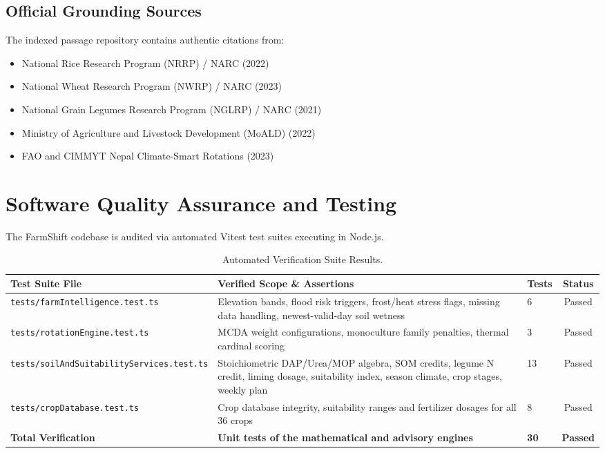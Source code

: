 \documentclass[11pt,a4paper]{report}
\begin{document}
\section{Official Grounding Sources}
The indexed passage repository contains authentic citations from:
\begin{itemize}
  \item National Rice Research Program (NRRP) / NARC (2022) \cite{narc2022rice}
  \item National Wheat Research Program (NWRP) / NARC (2023) \cite{narc2023wheat}
  \item National Grain Legumes Research Program (NGLRP) / NARC (2021) \cite{narc2021legumes}
  \item Ministry of Agriculture and Livestock Development (MoALD) (2022) \cite{moald2022fertilizer}
  \item FAO and CIMMYT Nepal Climate-Smart Rotations (2023) \cite{faocimmyt2023}
\end{itemize}

\chapter{Software Quality Assurance and Testing}

The FarmShift codebase is audited via automated Vitest test suites executing in Node.js.

\begin{table}[htbp]
\centering
\small
\caption{Automated Verification Suite Results.}
\label{tab:tests}
\begin{tabularx}{\textwidth}{lXlc}
\toprule
\textbf{Test Suite File} & \textbf{Verified Scope \& Assertions} & \textbf{Tests} & \textbf{Status} \\
\midrule
\texttt{tests/farmIntelligence.test.ts} & Elevation bands, flood risk triggers, frost/heat stress flags, missing data handling, newest-valid-day soil wetness & 6 & Passed \\
\texttt{tests/rotationEngine.test.ts} & MCDA weight configurations, monoculture family penalties, thermal cardinal scoring & 3 & Passed \\
\texttt{tests/soilAndSuitabilityServices.test.ts} & Stoichiometric DAP/Urea/MOP algebra, SOM credits, legume N credit, liming dosage, suitability index, season climate, crop stages, weekly plan & 13 & Passed \\
\texttt{tests/cropDatabase.test.ts} & Crop database integrity, suitability ranges and fertilizer dosages for all 36 crops & 8 & Passed \\
\midrule
\textbf{Total Verification} & \textbf{Unit tests of the mathematical and advisory engines} & \textbf{30} & \textbf{Passed} \\
\bottomrule
\end{tabularx}
\end{table}
\end{document}
